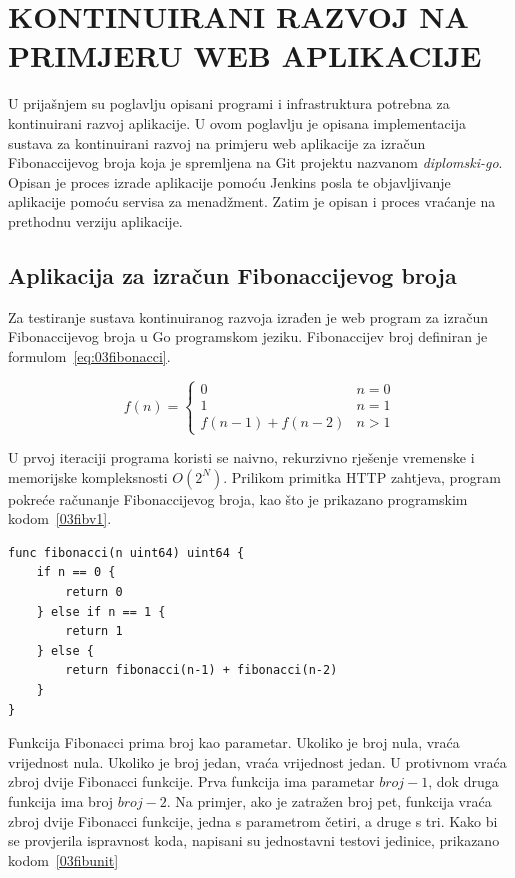 \chapter{KONTINUIRANI RAZVOJ NA PRIMJERU WEB APLIKACIJE}
U prijašnjem su poglavlju opisani programi i infrastruktura potrebna za kontinuirani razvoj
aplikacije. U ovom poglavlju je opisana implementacija sustava za kontinuirani razvoj na primjeru
web aplikacije za izračun Fibonaccijevog broja koja je spremljena na Git projektu nazvanom
\textit{diplomski-go}. Opisan je proces izrade aplikacije pomoću Jenkins posla te objavljivanje
aplikacije pomoću servisa za menadžment. Zatim je opisan i proces vraćanje na prethodnu verziju
aplikacije.

\section{Aplikacija za izračun Fibonaccijevog broja}
Za testiranje sustava kontinuiranog razvoja izrađen je web program za izračun Fibonaccijevog broja
u Go programskom jeziku. Fibonaccijev broj definiran je formulom~\ref{eq:03fibonacci}.

\begin{equation}
    f(n) = \begin{cases}
               0                & n = 0\\
               1                & n = 1\\
               f(n-1) + f(n-2)  & n > 1
           \end{cases}
   \label{eq:03fibonacci}
\end{equation}

U prvoj iteraciji programa koristi se naivno, rekurzivno rješenje vremenske i memorijske
kompleksnosti $O(2^N)$. Prilikom primitka HTTP zahtjeva, program pokreće računanje Fibonaccijevog
broja, kao što je prikazano programskim kodom~\ref{03fibv1}.

\begin{lstlisting}[float=h]
func fibonacci(n uint64) uint64 {
	if n == 0 {
		return 0
	} else if n == 1 {
		return 1
	} else {
		return fibonacci(n-1) + fibonacci(n-2)
	}
}
\end{lstlisting}

Funkcija Fibonacci prima broj kao parametar. Ukoliko je broj nula, vraća vrijednost nula.
Ukoliko je broj jedan, vraća vrijednost jedan. U protivnom vraća zbroj dvije Fibonacci funkcije.
Prva funkcija ima parametar $broj-1$, dok druga funkcija ima broj $broj-2$. Na primjer, ako je
zatražen broj pet, funkcija vraća zbroj dvije Fibonacci funkcije, jedna s parametrom četiri, a druge
s tri. Kako bi se provjerila ispravnost koda, napisani su jednostavni testovi jedinice, prikazano
kodom~\ref{03fibunit}

